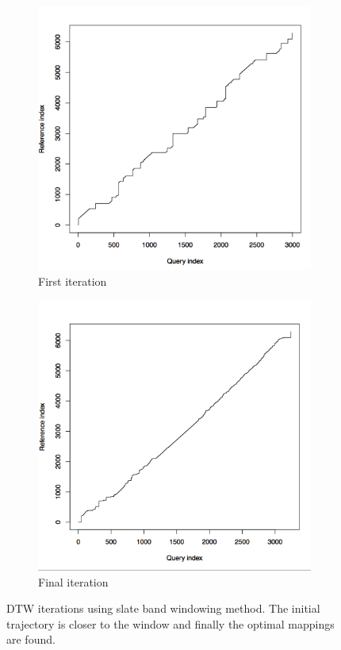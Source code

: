 \documentclass[hidelinks,BTech]{iitmdiss}
\begin{document}
\begin{figure}[H]
  \centering
  \begin{subfigure}[t]{0.48\textwidth}
  \includegraphics[width=\textwidth]{DTW_with_band_iter_1.png}
      \caption{First iteration}
  \end{subfigure}
  \begin{subfigure}[t]{0.48\textwidth}
    \centering
      \includegraphics[width=\textwidth]{DTW_with_band_iter_final.png}
      \caption{Final iteration}
  \end{subfigure}
  \caption{DTW iterations using slate band windowing method. The initial trajectory is closer to the window and finally the optimal mappings are found.}
\end{figure}


\begin{singlespace}
  \pagebreak
  \clearpage
  
\end{singlespace}
\end{document}
